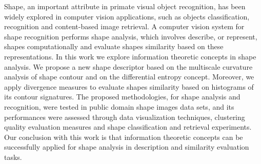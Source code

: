 
Shape, an important attribute in primate visual object recognition, has been widely explored in computer vision applications, such as objects classification, recognition and content-based image retrieval. A computer vision system for shape recognition performs shape analysis, which involves describe, or represent, shapes computationally and evaluate shapes similarity based on these representations. In this work we explore information theoretic concepts in shape analysis. We propose a new shape descriptor based on the multiscale curvature analysis of shape contour and on the differential entropy concept. Moreover, we apply divergence measures to evaluate shapes similarity based on histograms of its contour signatures. The proposed methodologies, for shape analysis and recognition, were tested in public domain shape images data sets, and its performances were assessed through data visualization techniques, clustering quality evaluation measures and shape classification and retrieval experiments. Our conclusion with this work is that information theoretic concepts can be successfully applied for shape analysis in description and similarity evaluation tasks. 
